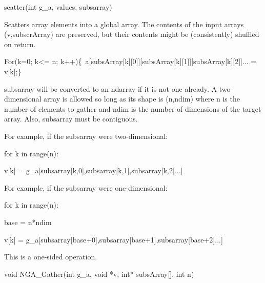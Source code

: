 \documentclass[12pt]{article}
\begin{document}
\begin{pyapi}
\begin{pycode}
scatter(int g_a, values, subsarray)  
\end{pycode}
\end{pyapi}
\ncoll

\begin{desc}

Scatters array elements into a global array. The contents of the input 
arrays (v,subscrArray) are preserved, but their contents might be 
(consistently) shuffled on return. 

For(k=0; k<= n; k++)\{\ a[subsArray[k][0]][subsArray[k][1]][subsArray[k][2]]... = v[k];\}\ 
 

subsarray will be converted to an ndarray if it is not one already. 
A two-dimensional array is allowed so long as its shape is (n,ndim) 
where n is the number of elements to gather and ndim is the number 
of dimensions of the target array. Also, subsarray must be contiguous.

For example, if the subsarray were two-dimensional:

for k in range(n):

    v[k] = g_a[subsarray[k,0],subsarray[k,1],subsarray[k,2]...]

For example, if the subsarray were one-dimensional:

for k in range(n):

    base = n*ndim

    v[k] = g_a[subsarray[base+0],subsarray[base+1],subsarray[base+2]...]

This is a one-sided operation.

\end{desc}


\begin{capi}
\begin{ccode}
void NGA_Gather(int g_a, void *v, int* subsArray[], int n)
\end{ccode}
\begin{funcargs}
\end{funcargs}
\end{capi}
\end{document}
